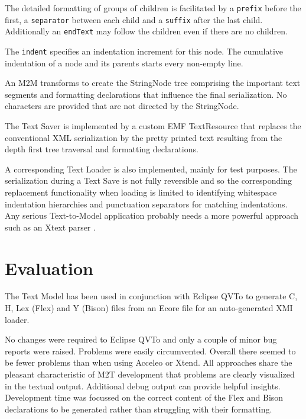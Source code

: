 \documentclass{llncs}
\begin{document}
The detailed formatting of groups of children is facilitated by a \verb$prefix$ before the first, a \verb$separator$ between each child and a \verb$suffix$ after the last child. Additionally an \verb$endText$ may follow the children even if there are no children.

The \verb$indent$ specifies an indentation increment for this node. The cumulative indentation of a node and its parents starts every non-empty line.

An M2M transforms to create the StringNode tree comprising the important text segments and formatting declarations that influence the final serialization. No characters are provided that are not directed by the StringNode.%

The Text Saver is implemented by a custom EMF TextResource that replaces the conventional XML serialization by the pretty printed text resulting from the depth first tree traversal and formatting declarations.

A corresponding Text Loader is also implemented, mainly for test purposes. The serialization during a Text Save is not fully reversible and so the corresponding replacement functionality when loading is limited to identifying whitespace indentation hierarchies and punctuation separators for matching indentations. Any serious Text-to-Model application probably needs a more powerful approach such as an Xtext parser \cite{Eclipse-Xtext}.

\section{Evaluation}\label{Evaluation}

The Text Model has been used in conjunction with Eclipse QVTo to generate C, H, Lex (Flex) and Y (Bison) files from an Ecore file for an auto-generated XMI loader.

No changes were required to Eclipse QVTo and only a couple of minor bug reports were raised. Problems were easily circumvented. Overall there seemed to be fewer problems than when using Acceleo or Xtend. All approaches share the pleasant characteristic of M2T development that problems are clearly visualized in the textual output. Additional debug output can provide helpful insights. Development time was focussed on the correct content of the Flex and Bison declarations to be generated rather than struggling with their formatting.
\end{document}
